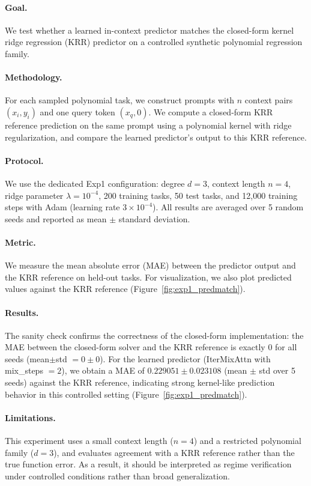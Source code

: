 \paragraph{Goal.}
We test whether a learned in-context predictor matches the closed-form kernel ridge regression (KRR) predictor on a controlled synthetic polynomial regression family.

\paragraph{Methodology.}
For each sampled polynomial task, we construct prompts with $n$ context pairs $(x_i, y_i)$ and one query token $(x_q, 0)$. We compute a closed-form KRR reference prediction on the same prompt using a polynomial kernel with ridge regularization, and compare the learned predictor's output to this KRR reference.

\paragraph{Protocol.}
We use the dedicated Exp1 configuration: degree $d=3$, context length $n=4$, ridge parameter $\lambda = 10^{-4}$, 200 training tasks, 50 test tasks, and 12{,}000 training steps with Adam (learning rate $3\times 10^{-4}$). All results are averaged over 5 random seeds and reported as mean $\pm$ standard deviation.

\paragraph{Metric.}
We measure the mean absolute error (MAE) between the predictor output and the KRR reference on held-out tasks. For visualization, we also plot predicted values against the KRR reference (Figure~\ref{fig:exp1_predmatch}).

\paragraph{Results.}
The sanity check confirms the correctness of the closed-form implementation: the MAE between the closed-form solver and the KRR reference is exactly $0$ for all seeds (mean$\pm$std $= 0 \pm 0$).
For the learned predictor (IterMixAttn with mix\_steps $=2$), we obtain a MAE of $0.229051 \pm 0.023108$ (mean $\pm$ std over 5 seeds) against the KRR reference, indicating strong kernel-like prediction behavior in this controlled setting (Figure~\ref{fig:exp1_predmatch}).

\paragraph{Limitations.}
This experiment uses a small context length ($n=4$) and a restricted polynomial family ($d=3$), and evaluates agreement with a KRR reference rather than the true function error. As a result, it should be interpreted as regime verification under controlled conditions rather than broad generalization.


